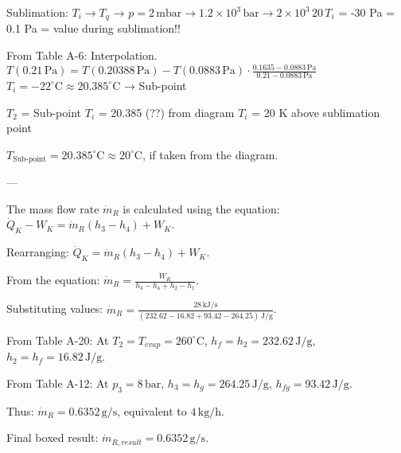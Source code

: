 Sublimation: \( T_i \to T_q \) → \( p = 2 \, \text{mbar} \to 1.2 \times 10^3 \, \text{bar} \to 2 \times 10^3 \, 20 \, T_i \)  
= -30 Pa = 0.1 Pa = value during sublimation!!  

From Table A-6: Interpolation. \( T(0.21 \, \text{Pa}) = T(0.20388 \, \text{Pa}) - T(0.0883 \, \text{Pa}) \cdot \frac{0.1635 - 0.0883 \, \text{Pa}}{0.21 - 0.0883 \, \text{Pa}} \)  
\( T_i = -22^\circ \text{C} \approx 20.385^\circ \text{C} \) → Sub-point  

\( T_2 \) = Sub-point \( T_i \) = 20.385 (??) from diagram  
\( T_i \) = 20 K above sublimation point  

\( T_{\text{Sub-point}} = 20.385^\circ \text{C} \approx 20^\circ \text{C} \), if taken from the diagram.  

---

The mass flow rate \( \dot{m}_{R} \) is calculated using the equation:
\( \dot{Q}_K - W_K = \dot{m}_R (h_3 - h_4) + W_K \).

Rearranging:
\( \dot{Q}_K = \dot{m}_R (h_3 - h_4) + W_K \).

From the equation:
\( \dot{m}_R = \frac{W_K}{h_3 - h_4 + h_2 - h_1} \).

Substituting values:
\( \dot{m}_R = \frac{28 \, \text{kJ/s}}{(232.62 - 16.82 + 93.42 - 264.25) \, \text{J/g}} \).

From Table A-20:
At \( T_2 = T_{evap} = 260^\circ \text{C} \), \( h_f = h_2 = 232.62 \, \text{J/g} \), \( h_2 = h_f = 16.82 \, \text{J/g} \).

From Table A-12:
At \( p_3 = 8 \, \text{bar} \), \( h_3 = h_g = 264.25 \, \text{J/g} \), \( h_{fg} = 93.42 \, \text{J/g} \).

Thus:
\( \dot{m}_R = 0.6352 \, \text{g/s} \), equivalent to \( 4 \, \text{kg/h} \).

Final boxed result:
\( \dot{m}_{R, result} = 0.6352 \, \text{g/s} \).